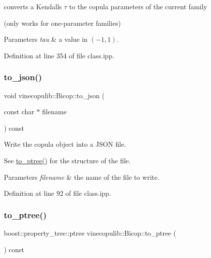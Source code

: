 converts a Kendall\textquotesingle{}s $ \tau $ to the copula parameters of the current family 

(only works for one-\/parameter families) 
\begin{DoxyParams}{Parameters}
{\em tau} & a value in $ (-1, 1) $. \\
\hline
\end{DoxyParams}


Definition at line 354 of file class.\+ipp.

\mbox{\label{classvinecopulib_1_1_bicop_a67cec4b86ecdae9ab4bd299fcd53ab60}} 
\subsubsection{\texorpdfstring{to\+\_\+json()}{to\_json()}}
{\footnotesize\ttfamily void vinecopulib\+::\+Bicop\+::to\+\_\+json (\begin{DoxyParamCaption}\item[{const char $\ast$}]{filename }\end{DoxyParamCaption}) const\hspace{0.3cm}{\ttfamily [inline]}}



Write the copula object into a J\+S\+ON file. 

See \hyperlink{classvinecopulib_1_1_bicop_a74397cf5f843f5aebb436a49322dd2f9}{to\+\_\+ptree()} for the structure of the file.


\begin{DoxyParams}{Parameters}
{\em filename} & the name of the file to write. \\
\hline
\end{DoxyParams}


Definition at line 92 of file class.\+ipp.

\mbox{\label{classvinecopulib_1_1_bicop_a74397cf5f843f5aebb436a49322dd2f9}} 
\subsubsection{\texorpdfstring{to\+\_\+ptree()}{to\_ptree()}}
{\footnotesize\ttfamily boost\+::property\+\_\+tree\+::ptree vinecopulib\+::\+Bicop\+::to\+\_\+ptree (\begin{DoxyParamCaption}{ }\end{DoxyParamCaption}) const\hspace{0.3cm}{\ttfamily [inline]}}



